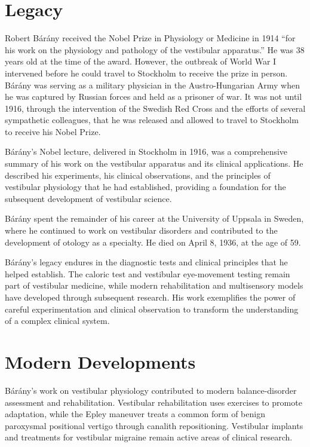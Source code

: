 \section{Legacy}

Robert B\'ar\'any received the Nobel Prize in Physiology or Medicine in 1914 ``for his work on the physiology and pathology of the vestibular apparatus.'' He was 38 years old at the time of the award. However, the outbreak of World War I intervened before he could travel to Stockholm to receive the prize in person. B\'ar\'any was serving as a military physician in the Austro-Hungarian Army when he was captured by Russian forces and held as a prisoner of war. It was not until 1916, through the intervention of the Swedish Red Cross and the efforts of several sympathetic colleagues, that he was released and allowed to travel to Stockholm to receive his Nobel Prize.

B\'ar\'any's Nobel lecture, delivered in Stockholm in 1916, was a comprehensive summary of his work on the vestibular apparatus and its clinical applications. He described his experiments, his clinical observations, and the principles of vestibular physiology that he had established, providing a foundation for the subsequent development of vestibular science.

B\'ar\'any spent the remainder of his career at the University of Uppsala in Sweden, where he continued to work on vestibular disorders and contributed to the development of otology as a specialty. He died on April 8, 1936, at the age of 59.

B\'ar\'any's legacy endures in the diagnostic tests and clinical principles that he helped establish. The caloric test and vestibular eye-movement testing remain part of vestibular medicine, while modern rehabilitation and multisensory models have developed through subsequent research. His work exemplifies the power of careful experimentation and clinical observation to transform the understanding of a complex clinical system.


\section{Modern Developments}

B\'ar\'any's work on vestibular physiology contributed to modern balance-disorder assessment and rehabilitation. Vestibular rehabilitation uses exercises to promote adaptation, while the Epley maneuver treats a common form of benign paroxysmal positional vertigo through canalith repositioning. Vestibular implants and treatments for vestibular migraine remain active areas of clinical research.


